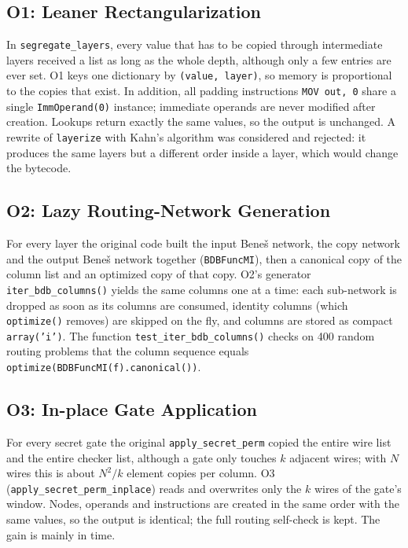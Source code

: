 \documentclass[12pt,a4paper,oneside]{report}
\newcommand{\code}[1]{\texttt{#1}}
\begin{document}
\subsection{O1: Leaner Rectangularization}
In \code{segregate\_layers}, every value that has to be copied through intermediate layers received
a list as long as the whole depth, although only a few entries are ever set. O1 keys one
dictionary by \code{(value, layer)}, so memory is proportional to the copies that exist.
In addition, all padding instructions \code{MOV out, 0} share a single \code{ImmOperand(0)}
instance; immediate operands are never modified after creation. Lookups return exactly the same
values, so the output is unchanged. A rewrite of \code{layerize} with Kahn's algorithm \cite{kahn}
was considered and rejected: it produces the same layers but a different order inside a layer,
which would change the bytecode.

\subsection{O2: Lazy Routing-Network Generation}
For every layer the original code built the input Bene\v{s} network, the copy network and the
output Bene\v{s} network together (\code{BDBFuncMI}), then a canonical copy of the column list and
an optimized copy of that copy. O2's generator \code{iter\_bdb\_columns()} yields the same columns
one at a time: each sub-network is dropped as soon as its columns are consumed, identity columns
(which \code{optimize()} removes) are skipped on the fly, and columns are stored as compact
\code{array('i')}. The function \code{test\_iter\_bdb\_columns()} checks on 400 random routing
problems that the column sequence equals \code{optimize(BDBFuncMI(f).canonical())}.

\subsection{O3: In-place Gate Application}
For every secret gate the original \code{apply\_secret\_perm} copied the entire wire list and the
entire checker list, although a gate only touches $k$ adjacent wires; with $N$ wires this is
about $N^2/k$ element copies per column. O3 (\code{apply\_secret\_perm\_inplace}) reads and
overwrites only the $k$ wires of the gate's window.
Nodes, operands and instructions are created in the same order with the same values, so the
output is identical; the full routing self-check is kept. The gain is mainly in time.
\end{document}
